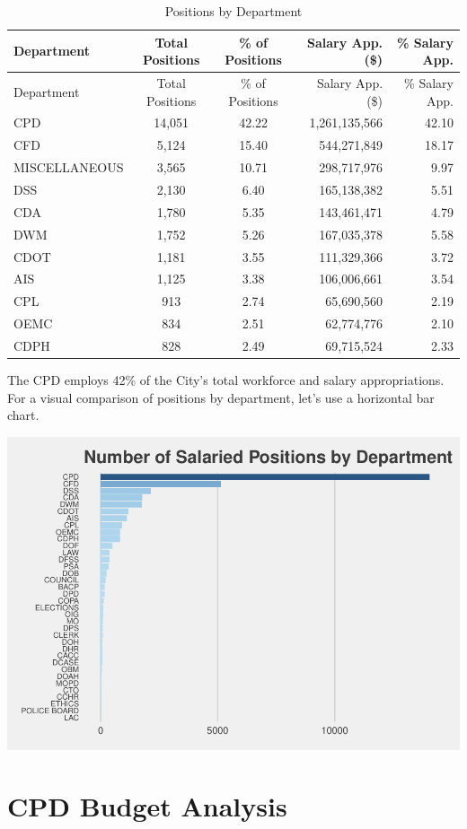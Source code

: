 \documentclass[
]{article}
\begin{document}
\begin{longtable}[]{@{}lccrr@{}}
\caption{Positions by Department}\tabularnewline
\toprule
Department & Total Positions & \% of Positions & Salary App. (\$) & \%
Salary App.\tabularnewline
\midrule
\endfirsthead
\toprule
Department & Total Positions & \% of Positions & Salary App. (\$) & \%
Salary App.\tabularnewline
\midrule
\endhead
CPD & 14,051 & 42.22 & 1,261,135,566 & 42.10\tabularnewline
CFD & 5,124 & 15.40 & 544,271,849 & 18.17\tabularnewline
MISCELLANEOUS & 3,565 & 10.71 & 298,717,976 & 9.97\tabularnewline
DSS & 2,130 & 6.40 & 165,138,382 & 5.51\tabularnewline
CDA & 1,780 & 5.35 & 143,461,471 & 4.79\tabularnewline
DWM & 1,752 & 5.26 & 167,035,378 & 5.58\tabularnewline
CDOT & 1,181 & 3.55 & 111,329,366 & 3.72\tabularnewline
AIS & 1,125 & 3.38 & 106,006,661 & 3.54\tabularnewline
CPL & 913 & 2.74 & 65,690,560 & 2.19\tabularnewline
OEMC & 834 & 2.51 & 62,774,776 & 2.10\tabularnewline
CDPH & 828 & 2.49 & 69,715,524 & 2.33\tabularnewline
\bottomrule
\end{longtable}

The CPD employs 42\% of the City's total workforce and salary
appropriations. For a visual comparison of positions by department,
let's use a horizontal bar chart.

\begin{center}\includegraphics{cpd_budget_analysis_files/figure-latex/positions by dept bar chart-1} \end{center}

\hypertarget{cpd-budget-analysis}{%
\section{CPD Budget Analysis}\label{cpd-budget-analysis}}
\end{document}
